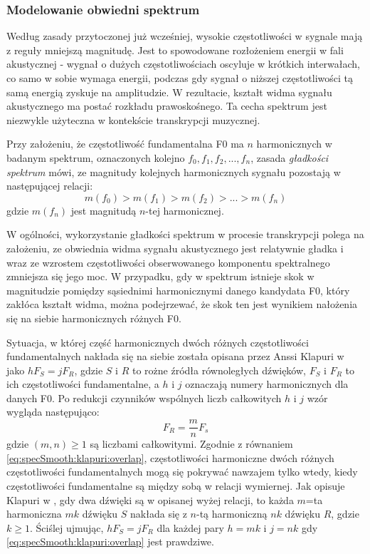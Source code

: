 \documentclass[12pt,a4paper,twoside]{mwart}
\begin{document}
\subsubsection{Modelowanie obwiedni spektrum}\label{sec:specSmoothnes}
Według zasady przytoczonej już wcześniej, wysokie częstotliwości w sygnale mają z reguły mniejszą magnitudę. Jest to spowodowane rozłożeniem energii w fali akustycznej - wygnał o dużych częstotliwościach oscyluje w krótkich interwałach, co samo w sobie wymaga energii, podczas gdy sygnał o niższej częstotliwości tą samą energią zyskuje na amplitudzie. W rezultacie, kształt widma sygnału akustycznego ma postać rozkładu prawoskośnego. Ta cecha spektrum jest niezwykle użyteczna w kontekście transkrypcji muzycznej.

Przy założeniu, że częstotliwość fundamentalna F0 ma $n$ harmonicznych w badanym spektrum, oznaczonych kolejno $f_0, f_1, f_2, ..., f_n$, zasada \textit{gładkości spektrum} mówi, ze magnitudy kolejnych harmonicznych sygnału pozostają w następującej relacji:
\begin{equation}\label{eq:specSmooth:principle}
  m(f_0) > m(f_1) > m(f_2) > ... > m(f_n)
\end{equation}
gdzie $m(f_n)$ jest magnitudą $n$-tej harmonicznej.

W ogólności, wykorzystanie gładkości spektrum w procesie transkrypcji polega na założeniu, ze obwiednia widma sygnału akustycznego jest relatywnie gładka i wraz ze wzrostem częstotliwości obserwowanego komponentu spektralnego zmniejsza się jego moc. W przypadku, gdy w spektrum istnieje skok w magnitudzie pomiędzy sąsiednimi harmonicznymi danego kandydata F0, który zakłóca kształt widma, można podejrzewać, że skok ten jest wynikiem nałożenia się na siebie harmonicznych różnych F0.


Sytuacja, w której część harmonicznych dwóch różnych częstotliwości fundamentalnych nakłada się na siebie została opisana przez Anssi Klapuri w \cite[3382]{Transcription:Klapuri:MultipitchEstimationAndSeparation} jako $hF_S = jF_R$, gdzie $S$ i $R$ to rożne źródła równoległych dźwięków, $F_S$ i $F_R$ to ich częstotliwości fundamentalne, a $h$ i $j$ oznaczają numery harmonicznych dla danych F0. Po redukcji czynników wspólnych liczb całkowitych $h$ i $j$ wzór wygląda następująco:
\begin{equation}\label{eq:specSmooth:klapuri:overlap}
  F_R = \frac{m}{n}F_s
\end{equation}
gdzie $(m, n) \geqslant 1$ są liczbami całkowitymi. Zgodnie z równaniem \ref{eq:specSmooth:klapuri:overlap}, częstotliwości harmoniczne dwóch różnych częstotliwości fundamentalnych mogą się pokrywać nawzajem tylko wtedy, kiedy częstotliwości fundamentalne są między sobą w relacji wymiernej. Jak opisuje Klapuri w \cite[3382]{Transcription:Klapuri:MultipitchEstimationAndSeparation}, gdy dwa dźwięki są w opisanej wyżej relacji, to każda $m$=ta harmoniczna $mk$ dźwięku $S$ nakłada się z $n$-tą harmoniczną $nk$ dźwięku $R$, gdzie $k \geqslant 1$. Ściślej ujmując, $hF_S = jF_R$ dla każdej pary $h=mk$ i $j=nk$ gdy \ref{eq:specSmooth:klapuri:overlap} jest prawdziwe.
\end{document}
